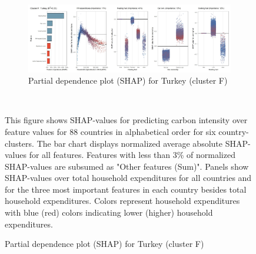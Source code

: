 \begin{figure}[ht!]\ContinuedFloat
    \centering
    \begin{subfigure}[t!]{\textwidth}     
    \centering
         \caption{Partial dependence plot (SHAP) for Turkey (cluster F)}
         \label{fig:5b_TUR}
         \includegraphics[width=\textwidth]{Figure 5b/Figure_5b_TUR}     
    \end{subfigure}
    \\
    \vspace{0.5cm}
    \begin{subcaption2}
     This figure shows SHAP-values for predicting carbon intensity over feature values for 88 countries in alphabetical order for six country-clusters. The bar chart displays normalized average absolute SHAP-values for all features. Features with less than 3\% of normalized SHAP-values are subsumed as "Other features (Sum)". Panels show SHAP-values over total household expenditures for all countries and for the three most important features in each country besides total household expenditures. Colors represent household expenditures with blue (red) colors indicating lower (higher) household expenditures.
     \end{subcaption2}
\end{figure}